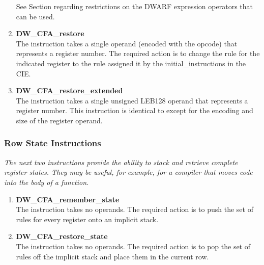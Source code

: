 \begin{enumerate}[1.]
See Section  
regarding restrictions on the DWARF
expression operators that can be used.

\item \textbf{ DW\-\_CFA\-\_restore} \\
The  instruction takes a single operand (encoded
with the opcode) that represents a register number. The
required action is to change the rule for the indicated
register to the rule assigned it by the initial\_instructions
in the CIE.

\item \textbf{DW\-\_CFA\-\_restore\-\_extended} \\
The  instruction takes a single unsigned
LEB128 operand that represents a register number. This
instruction is identical to  except for the
encoding and size of the register operand.

\end{enumerate}

\subsubsection{Row State Instructions}
\label{chap:rowstateinstructions}

\textit{The next two instructions provide the ability to stack and
retrieve complete register states. They may be useful, for
example, for a compiler that moves  code 
into the
body of a function.}


\begin{enumerate}[1.]

\item \textbf{DW\-\_CFA\-\_remember\-\_state} \\
The  instruction takes no operands. The
required action is to push the set of rules for every register
onto an implicit stack.


\item \textbf{DW\-\_CFA\-\_restore\-\_state} \\
The  instruction takes no operands. The
required action is to pop the set of rules off the implicit
stack and place them in the current row.

\end{enumerate}


